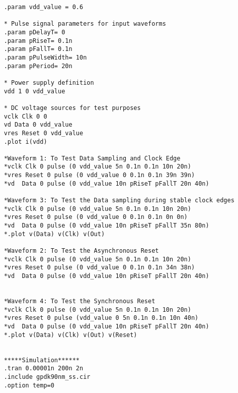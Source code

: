 \begin{lstlisting}
    .param vdd_value = 0.6
    
    * Pulse signal parameters for input waveforms
    .param pDelayT= 0       
    .param pRiseT= 0.1n    
    .param pFallT= 0.1n     
    .param pPulseWidth= 10n
    .param pPeriod= 20n    
    
    * Power supply definition
    vdd 1 0 vdd_value        
    
    * DC voltage sources for test purposes
    vclk Clk 0 0               
    vd Data 0 vdd_value
    vres Reset 0 vdd_value
    .plot i(vdd)
    
    *Waveform 1: To Test Data Sampling and Clock Edge
    *vclk Clk 0 pulse (0 vdd_value 5n 0.1n 0.1n 10n 20n)     
    *vres Reset 0 pulse (0 vdd_value 0 0.1n 0.1n 39n 39n)       
    *vd  Data 0 pulse (0 vdd_value 10n pRiseT pFallT 20n 40n) 
    
    *Waveform 3: To Test the Data sampling during stable clock edges
    *vclk Clk 0 pulse (0 vdd_value 5n 0.1n 0.1n 10n 20n)     
    *vres Reset 0 pulse (0 vdd_value 0 0.1n 0.1n 0n 0n)       
    *vd  Data 0 pulse (0 vdd_value 10n pRiseT pFallT 35n 80n) 
    *.plot v(Data) v(Clk) v(Out)
    
    *Waveform 2: To Test the Asynchronous Reset
    *vclk Clk 0 pulse (0 vdd_value 5n 0.1n 0.1n 10n 20n)     
    *vres Reset 0 pulse (0 vdd_value 0 0.1n 0.1n 34n 38n)       
    *vd  Data 0 pulse (0 vdd_value 10n pRiseT pFallT 20n 40n)
    
    
    *Waveform 4: To Test the Synchronous Reset
    *vclk Clk 0 pulse (0 vdd_value 5n 0.1n 0.1n 10n 20n)     
    *vres Reset 0 pulse (vdd_value 0 5n 0.1n 0.1n 10n 40n)       
    *vd  Data 0 pulse (0 vdd_value 10n pRiseT pFallT 20n 40n)
    *.plot v(Data) v(Clk) v(Out) v(Reset)
    
    
    *****Simulation******
    .tran 0.00001n 200n 2n
    .include gpdk90nm_ss.cir
    .option temp=0
    
\end{lstlisting}
% 

% 

% 
